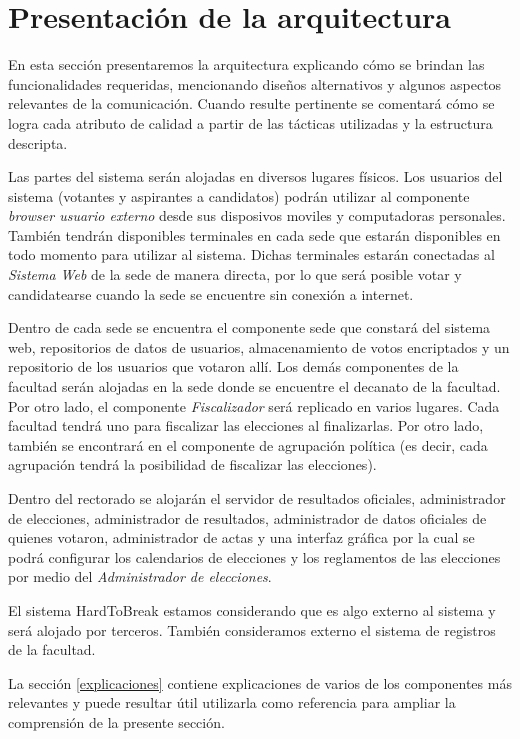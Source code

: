 \section{Presentación de la arquitectura}

En esta sección presentaremos la arquitectura explicando cómo se brindan las funcionalidades requeridas, mencionando diseños alternativos y algunos aspectos relevantes de la comunicación. Cuando resulte pertinente se comentará cómo se logra cada atributo de calidad a partir de las tácticas utilizadas y la estructura descripta. 


Las partes del sistema ser\'an alojadas en diversos lugares f\'isicos. Los usuarios del sistema (votantes y aspirantes a candidatos) podr\'an utilizar al componente \emph{browser usuario externo} desde sus disposivos moviles y computadoras personales. Tambi\'en tendr\'an disponibles terminales en cada sede que estar\'an disponibles en todo momento para utilizar al sistema. Dichas terminales estar\'an conectadas al \emph{Sistema Web} de la sede de manera directa, por lo que ser\'a posible votar y candidatearse cuando la sede se encuentre sin conexi\'on a internet.

Dentro de cada sede se encuentra el componente sede que constar\'a del sistema web, repositorios de datos de usuarios, almacenamiento de votos encriptados y un repositorio de los usuarios que votaron all\'i. 
Los dem\'as componentes de la facultad ser\'an alojadas en la sede donde se encuentre el decanato de la facultad. Por otro lado, el componente \emph{Fiscalizador} ser\'a replicado en varios lugares. Cada facultad tendr\'a uno para fiscalizar las elecciones al finalizarlas. Por otro lado, tambi\'en se encontrar\'a en el componente de agrupaci\'on pol\'itica (es decir, cada agrupaci\'on tendr\'a la posibilidad de fiscalizar las elecciones).

Dentro del rectorado se alojar\'an el servidor de resultados oficiales, administrador de elecciones, administrador de resultados, administrador de datos oficiales de quienes votaron, administrador de actas y una interfaz gr\'afica por la cual se podr\'a configurar los calendarios de elecciones y los reglamentos de las elecciones por medio del \emph{Administrador de elecciones}.

El sistema HardToBreak estamos considerando que es algo externo al sistema y ser\'a alojado por terceros. Tambi\'en consideramos externo el sistema de registros de la facultad.


La sección \ref{explicaciones} contiene explicaciones de varios de los componentes más relevantes y puede resultar útil utilizarla como referencia para ampliar la comprensión de la presente sección.


